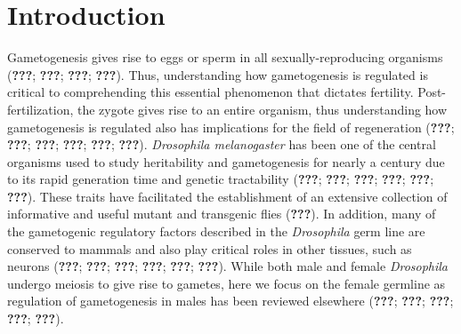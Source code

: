 \documentclass[12pt,oneside]{reedthesis}
\begin{document}
\hypertarget{introduction}{%
\section{Introduction}\label{introduction}}

Gametogenesis gives rise to eggs or sperm in all sexually-reproducing
organisms ({\textbf{???}}; {\textbf{???}}; {\textbf{???}}; {\textbf{???}}).
Thus, understanding how gametogenesis is regulated is critical to
comprehending this essential phenomenon that dictates fertility.
Post-fertilization, the zygote gives rise to an entire organism, thus
understanding how gametogenesis is regulated also has implications for
the field of regeneration ({\textbf{???}}; {\textbf{???}}; {\textbf{???}}; {\textbf{???}}; {\textbf{???}}; {\textbf{???}}).
\emph{Drosophila melanogaster} has been one of the central organisms used to
study heritability and gametogenesis for nearly a century due to its
rapid generation time and genetic tractability ({\textbf{???}}; {\textbf{???}}; {\textbf{???}}; {\textbf{???}}; {\textbf{???}}; {\textbf{???}}). These traits have facilitated the establishment of an
extensive collection of informative and useful mutant and transgenic
flies ({\textbf{???}}). In addition, many of the gametogenic regulatory
factors described in the \emph{Drosophila} germ line are conserved to mammals
and also play critical roles in other tissues, such as neurons
({\textbf{???}}; {\textbf{???}}; {\textbf{???}}; {\textbf{???}}; {\textbf{???}}; {\textbf{???}}). While both male and female \emph{Drosophila}
undergo meiosis to give rise to gametes, here we focus on the female
germline as regulation of gametogenesis in males has been reviewed
elsewhere ({\textbf{???}}; {\textbf{???}}; {\textbf{???}}; {\textbf{???}}; {\textbf{???}}).
\end{document}
